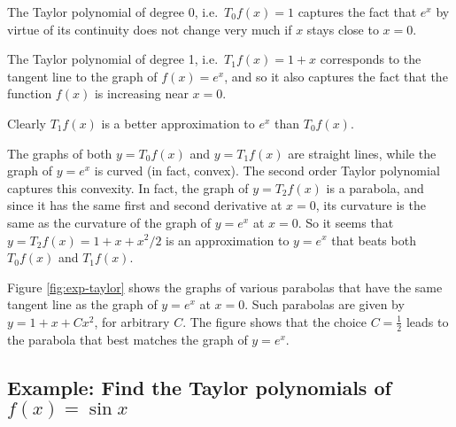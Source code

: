 The Taylor polynomial of degree 0, i.e.\ $T_0f(x)=1$ captures the fact that
$e^x$ by virtue of its continuity does not change very much if $x$ stays
close to $x=0$.

The Taylor polynomial of degree 1, i.e.\ $T_1f(x)=1+x$ corresponds to the
tangent line to the graph of $f (x)=e^x$, and so it also captures the fact
that the function $f(x)$ is increasing near $x=0$.

Clearly $T_1f(x)$ is a better approximation to $e^x$ than $T_0f (x)$.

The graphs of both $y=T_0f (x)$ and $y=T_1f (x)$ are straight lines, while
the graph of $y=e^x$ is curved (in fact, convex). The second order Taylor
polynomial captures this convexity. In fact, the graph of $y=T_2f(x)$ is a
parabola, and since it has the same first and second derivative at $x=0$,
its curvature is the same as the curvature of the graph of $y=e^x$ at
$x=0$.  So it seems that $y=T_2f(x) = 1+x+x^2/2$ is an approximation to $y=e^x$
that beats both $T_0f(x)$ and $T_1f(x)$.

Figure \ref{fig:exp-taylor} shows the graphs of various parabolas that
have the same tangent line as the graph of $y=e^x$ at $x=0$.  Such parabolas are
given by $y=1+x+Cx^2$, for arbitrary $C$.  The figure shows that the choice
$C=\frac12$ leads to the parabola that best matches the graph of $y=e^x$.

\subsection{Example: Find the Taylor polynomials of $f (x)=\sin x$} %

